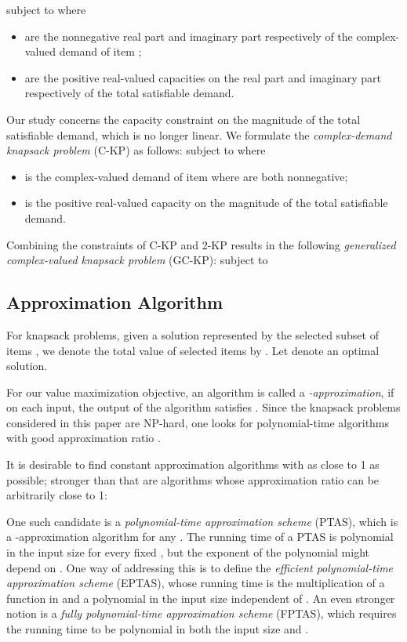 \documentclass{aamas2013}
\begin{document}
subject to 
where 
\begin{itemize}

\item  are the nonnegative real part and imaginary part respectively of the complex-valued demand  of item ;

\item  are the positive real-valued capacities on the real part and imaginary part respectively of the total satisfiable demand.
\end{itemize}





Our study concerns the capacity constraint on the magnitude of the total satisfiable demand, which is no longer linear.  We formulate the {\em complex-demand knapsack problem} ({\sc C-KP}) as follows: 
subject to  
where
\begin{itemize}

\item  is the complex-valued demand of item  where  are both nonnegative;

\item  is the positive real-valued capacity on the magnitude of the total satisfiable demand. 
\end{itemize}

Combining the constraints of C-KP and 2-KP results in the following {\em generalized complex-valued knapsack problem} ({\sc GC-KP}): 
subject to  

\subsection{Approximation Algorithm}
\noindent
For knapsack problems, given a solution represented by the selected subset of items , we denote the total value of selected items by .  Let  denote an optimal solution.

For our value maximization objective, an algorithm is called a {\em -approximation}, if on each input, the output  of the algorithm satisfies .   
Since the knapsack problems considered in this paper are NP-hard, one looks for polynomial-time algorithms with good approximation ratio . 

It is desirable to find constant approximation algorithms with  as close to 1 as possible; stronger than that are algorithms whose approximation ratio can be arbitrarily close to 1: 

One such candidate is a {\em polynomial-time approximation scheme} (PTAS), which is a -approximation algorithm for any .  The running time of a PTAS is polynomial in the input size for every fixed , but the exponent of the polynomial might depend on .  One way of addressing this is to define the {\em efficient polynomial-time approximation scheme} (EPTAS), whose running time is the multiplication of a function in  and a polynomial in the input size independent of .
An even stronger notion is a {\em fully polynomial-time approximation scheme} (FPTAS), which requires the running time to be polynomial in both the input size and .  
\end{document}
